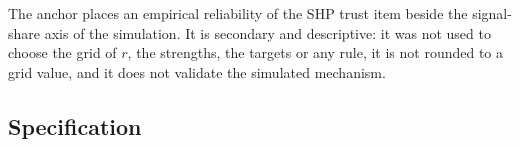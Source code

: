 
The anchor places an empirical reliability of the SHP trust item beside the signal-share axis of the simulation. It is secondary and descriptive: it was not used to choose the grid of $r$, the strengths, the targets or any rule, it is not rounded to a grid value, and it does not validate the simulated mechanism.

\subsection{Specification}\label{sec:shp-specification}

